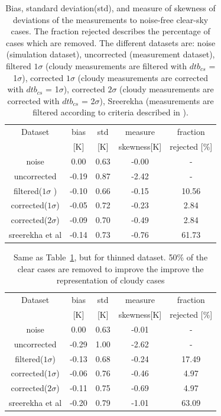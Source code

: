 \documentclass[12pt]{article}
\begin{document}
\begin{table}[!bt]
	\centering
	\begin{tabular}[b]{c|c|c|c|c}
		Dataset  		  &   bias &   std &   measure  & fraction  \\
							&   [K]  &   [K] & skewness[K] & rejected [\%]\\
		\hline
		noise             		&   0.00 &  0.63 &              -0.00 &                - \\
		uncorrected       		&  -0.19 &  0.87 &              -2.42 &                - \\
		filtered($1\sigma$ ) 	&  -0.10 &  0.66 &              -0.15 &               10.56 \\
		corrected($1\sigma$) 	&  -0.05 &  0.72 &              -0.23 &                2.84 \\
		corrected($2\sigma$) 	&  -0.09 &  0.70 &              -0.49 &                2.84 \\
		sreerekha et al   		&  -0.14 &  0.73 &              -0.76 &               61.73 \\
		\hline
	\end{tabular}
	\caption{Bias, standard deviation(std), and measure of skewness of deviations of the measurements to noise-free clear-sky cases. The fraction rejected describes the percentage of cases which are removed. The different datasets are: noise (simulation dataset), uncorrected (measurement dataset), filtered $1\sigma$ (cloudy measurements are filtered with $dtb_{cs}$ = 1$\sigma$), corrected $1\sigma$ (cloudy measurements are corrected with $dtb_{cs}$ = 1$\sigma$), corrected $2\sigma$ (cloudy measurements are corrected with $dtb_{cs}$ = 2$\sigma$), Sreerekha (measurements are filtered according to criteria described in \cite{rekha2012potential}).   }
	\label{tab:correction:stats:34:42}
\end{table}
%
\begin{table}[!bt]
	\centering
	\begin{tabular}[b]{c|c|c|c|c}
		Dataset  		  &   bias &   std &   measure  & fraction  \\
		&   [K]  &   [K] & skewness[K] & rejected [\%]\\
		\hline
noise             		&   0.00 &  0.63 &              -0.01 &                - \\
uncorrected       		&  -0.29 &  1.00 &              -2.62 &                - \\
filtered($1\sigma$)  	&  -0.13 &  0.68 &              -0.24 &               17.49 \\
corrected($1\sigma$) 	&  -0.06 &  0.76 &              -0.46 &                4.97 \\
corrected($2\sigma$) 	&  -0.11 &  0.75 &              -0.69 &                4.97 \\
sreerekha et al   		&  -0.20 &  0.79 &              -1.01 &               63.09 \\
		\hline
\end{tabular}
\caption{Same as Table~\ref{tab:correction:stats:34:42}, but for thinned dataset. 50\% of the clear cases are removed to improve the improve the representation of cloudy cases }
\label{tab:correction:stats:34:42:thinned}
\end{table}
\end{document}
